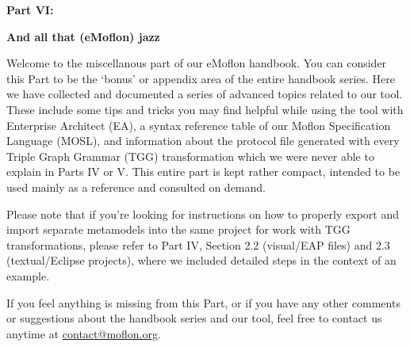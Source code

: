 \vspace*{2cm}

{\bf \huge Part VI:}
\vspace{1cm}

{\Huge \bf And all that (eMoflon) jazz}
\vspace{1cm}

\genHeader

Welcome to the miscellanous part of our eMoflon handbook. You can consider this Part to be the `bonus' or appendix area of the entire handbook series. Here we
have collected and documented a series of advanced topics related to our tool. These include some tips and tricks you may find helpful while using the tool with
Enterprise Architect (EA), a syntax reference table of our Moflon Specification Language (MOSL), and information about the protocol file generated with every
Triple Graph Grammar (TGG) transformation which we were never able to explain in Parts IV or V. This entire part is kept rather compact, intended to be used
mainly as a reference and consulted on demand.

Please note that if you're looking for instructions on how to properly export and import separate metamodels into the same project for work with TGG
transformations, please refer to Part IV, Section 2.2 (visual/EAP files) and 2.3 (textual/Eclipse projects), where we included detailed steps in the context of
an example.

If you feel anything is missing from this Part, or if you have any other comments or suggestions about the handbook series and our tool, feel free to contact us
anytime at \href{mailto:contact@moflon.org}{contact@moflon.org}.
















